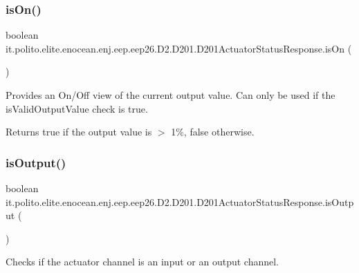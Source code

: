 \subsubsection{\texorpdfstring{is\+On()}{isOn()}}
{\footnotesize\ttfamily boolean it.\+polito.\+elite.\+enocean.\+enj.\+eep.\+eep26.\+D2.\+D201.\+D201\+Actuator\+Status\+Response.\+is\+On (\begin{DoxyParamCaption}{ }\end{DoxyParamCaption})}

Provides an On/\+Off view of the current output value. Can only be used if the {\ttfamily is\+Valid\+Output\+Value} check is true.

\begin{DoxyReturn}{Returns}
true if the output value is $>$ 1\%, false otherwise. 
\end{DoxyReturn}
\hypertarget{classit_1_1polito_1_1elite_1_1enocean_1_1enj_1_1eep_1_1eep26_1_1_d2_1_1_d201_1_1_d201_actuator_status_response_a0d7fbd695432f0a0554b73ac043834a9}{}\label{classit_1_1polito_1_1elite_1_1enocean_1_1enj_1_1eep_1_1eep26_1_1_d2_1_1_d201_1_1_d201_actuator_status_response_a0d7fbd695432f0a0554b73ac043834a9} 
\subsubsection{\texorpdfstring{is\+Output()}{isOutput()}}
{\footnotesize\ttfamily boolean it.\+polito.\+elite.\+enocean.\+enj.\+eep.\+eep26.\+D2.\+D201.\+D201\+Actuator\+Status\+Response.\+is\+Output (\begin{DoxyParamCaption}{ }\end{DoxyParamCaption})}

Checks if the actuator channel is an input or an output channel.

